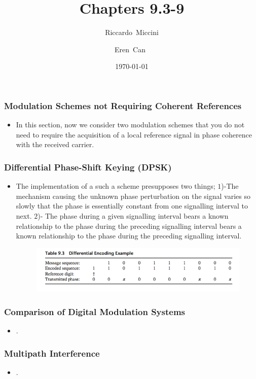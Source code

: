 \documentclass{beamer}
\title{Chapters 9.3-9}
\subtitle{}
\author[Riccardo \and Eren]{Riccardo~Miccini\inst{1} \and Eren~Can~\inst{1}}
\institute[DTU]
{
	\inst{1}
	Technical University of Denmark\\
	Digital Communication
}
\date{\today}
\begin{document}
\frame{\titlepage}

\begin{frame}
	\frametitle{Modulation Schemes not Requiring Coherent References}
	\begin{itemize}
		\item In this section, now we consider two modulation schemes that you do not need to require the acquisition of  a local reference signal in phase coherence with the received carrier. 
	\end{itemize}
\end{frame}

\begin{frame}
	\frametitle{Differential Phase-Shift Keying  (DPSK)}
	\begin{itemize}
		\item The implementation of a such a scheme presupposes two things;
		$1$)-The mechanism causing the unknown phase perturbation on the signal varies so slowly that the phase is essentially constant from one signalling interval to next.
		$2$)- The phase during a given signalling interval bears a known relationship to the phase during the preceding signalling interval bears a known relationship to the phase during the preceding signalling interval.
	\begin{figure}
	\includegraphics{9.3 Figure.png}
	\end{figure}
	\end{itemize}
\end{frame}


\begin{frame}
	\frametitle{Comparison of Digital Modulation Systems}
	\begin{itemize}
		\item .
	\end{itemize}
\end{frame}


\begin{frame}
	\frametitle{Multipath Interference}
	\begin{itemize}
		\item .
	\end{itemize}
\end{frame}
\end{document}
